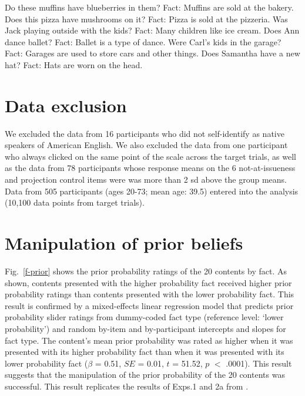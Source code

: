 \documentclass[11pt,fleqn]{article}
\newcommand{\figref}[1]{Fig.~\ref{#1}}
\newcommand{\6}{\mbox{$[\hspace*{-.6mm}[$}}
\newcommand{\9}{\mbox{$]\hspace*{-.6mm}]$}}
\begin{document}
\begin{exe}
\ex\label{control-items}
\begin{xlist}
\ex Do these muffins have blueberries in them? Fact: Muffins are sold at the bakery. 
\ex Does this pizza have mushrooms on it? Fact: Pizza is sold at the pizzeria.
\ex Was Jack playing outside with the kids? Fact: Many children like ice cream.
\ex Does Ann dance ballet? Fact: Ballet is a type of dance.
\ex Were Carl's kids in the garage? Fact: Garages are used to store cars and other things.
\ex Does Samantha have a new hat? Fact: Hats are worn on the head.
\end{xlist}
\end{exe}

\section{Data exclusion}\label{a-excl}

We excluded the data from 16 participants who did not self-identify as native speakers of American English. We also excluded the data from one participant who always clicked on the same point of the scale across the target trials, as well as the data from 78 participants whose response means on the 6 not-at-issueness and projection control items were was more than 2 sd above the group means. Data from 505 participants (ages 20-73; mean age: 39.5) entered into the analysis (10,100 data points from target trials).

\section{Manipulation of prior beliefs}\label{a-beliefs}


\figref{f-prior} shows the prior probability ratings of the 20 contents by fact. As shown, contents presented with the higher probability fact received higher prior probability ratings than contents presented with the lower probability fact. This result is confirmed by a mixed-effects linear regression model that predicts prior probability slider ratings from dummy-coded fact type (reference level: `lower probability') and random by-item and by-participant intercepts and slopes for fact type.  The content's mean prior probability was rated as higher when it was presented with its higher probability fact than when it was presented with its lower probability fact ($\beta$ = 0.51, $SE$ = 0.01, $t$ = 51.52, $p$ $<$ .0001). This result suggests that the manipulation of the prior probability of the 20 contents was successful. This result replicates the results of Exps.1 and 2a from \citealt{degen-tonhauser-openmind}.
\end{document}
